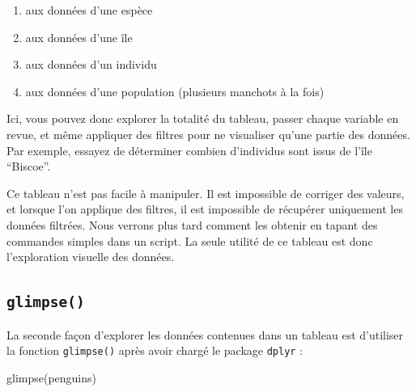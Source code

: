 \documentclass[
  a4paper,
  DIV=11,
  numbers=noendperiod,
  oneside]{scrreprt}
\newenvironment{Shaded}{}{}
\newcommand{\FunctionTok}[1]{\textcolor[rgb]{0.44,0.26,0.76}{#1}}
\newcommand{\NormalTok}[1]{\textcolor[rgb]{0.14,0.16,0.18}{#1}}
\providecommand{\tightlist}{%
  \setlength{\itemsep}{0pt}\setlength{\parskip}{0pt}}\usepackage{longtable,booktabs,array}
\begin{document}
\begin{tcolorbox}[enhanced jigsaw, arc=.35mm, opacityback=0, colbacktitle=quarto-callout-tip-color!10!white, bottomrule=.15mm, coltitle=black, colframe=quarto-callout-tip-color-frame, breakable, toprule=.15mm, title=\textcolor{quarto-callout-tip-color}{\faLightbulb}\hspace{0.5em}{Quizz : à quoi correspondent chacune des lignes de ce tableau ?}, leftrule=.75mm, titlerule=0mm, bottomtitle=1mm, toptitle=1mm, left=2mm, rightrule=.15mm, opacitybacktitle=0.6, colback=white]

\begin{enumerate}
\def\labelenumi{\alph{enumi}.}
\tightlist
\item
  aux données d'une espèce
\item
  aux données d'une île
\item
  aux données d'un individu
\item
  aux données d'une population (plusieurs manchots à la fois)
\end{enumerate}

\end{tcolorbox}

Ici, vous pouvez donc explorer la totalité du tableau, passer chaque
variable en revue, et même appliquer des filtres pour ne visualiser
qu'une partie des données. Par exemple, essayez de déterminer combien
d'individus sont issus de l'île ``Biscoe''.

Ce tableau n'est pas facile à manipuler. Il est impossible de corriger
des valeurs, et lorsque l'on applique des filtres, il est impossible de
récupérer uniquement les données filtrées. Nous verrons plus tard
comment les obtenir en tapant des commandes simples dans un script. La
seule utilité de ce tableau est donc l'exploration visuelle des données.

\subsection{\texorpdfstring{\texttt{glimpse()}}{glimpse()}}\label{glimpse}

La seconde façon d'explorer les données contenues dans un tableau est
d'utiliser la fonction \texttt{glimpse()} après avoir chargé le package
\texttt{dplyr} :

\begin{Shaded}
\begin{Highlighting}[]
\FunctionTok{glimpse}\NormalTok{(penguins)}
\end{Highlighting}
\end{Shaded}
\end{document}

